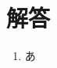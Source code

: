 \documentclass[platex,dvipdfmx]{jlreq}
\begin{document}
\section*{解答}
\begin{enumerate}[(1)   ]
  \item あ
\end{enumerate}
\end{document}
